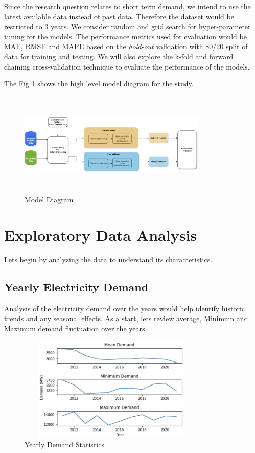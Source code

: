 \documentclass[mstat,12pt]{unswthesis}
\begin{document}
Since the research question relates to short term demand, we intend to
use the latest available data instead of past data. Therefore the
dataset would be restricted to 3 years. We consider random and grid
search for hyper-parameter tuning for the models. The performance
metrics used for evaluation would be MAE, RMSE and MAPE based on the
\emph{hold-out} validation with 80/20 split of data for training and
testing. We will also explore the k-fold and forward chaining
cross-validation technique to evaluate the performance of the models.

The Fig \ref{model_diagram} shows the high level model diagram for the
study.

\begin{figure}[H]
\centering
\includegraphics[width=0.80\textwidth,height=5cm]{model_diagram.png}
\caption{Model Diagram}
\label{model_diagram}
\end{figure}

\chapter{Exploratory Data Analysis}\label{exploratory-data-analysis}

Lets begin by analyzing the data to understand its characteristics.

\section{Yearly Electricity Demand}\label{yearly-electricity-demand}

Analysis of the electricity demand over the years would help identify
historic trends and any seasonal effects. As a start, lets review
average, Minimum and Maximum demand fluctuation over the years.

\begin{figure}[H]
\centering
\includegraphics[width=0.80\textwidth,height=5cm]{demand_stats.png}
\caption{Yearly Demand Statistics}
\label{demand_stats}
\end{figure}
\end{document}
